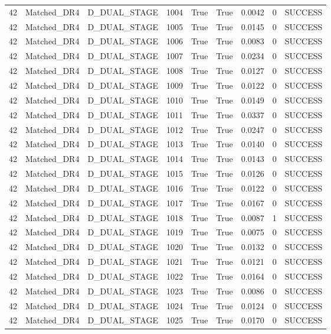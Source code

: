 \documentclass[11pt,a4paper,oneside]{book}
\begin{document}
\begin{longtable}{l l l l l l l l l}
42 & Matched\_DR4 & D\_DUAL\_STAGE & 1004 & True & True & 0.0042 & 0 & SUCCESS \\
42 & Matched\_DR4 & D\_DUAL\_STAGE & 1005 & True & True & 0.0145 & 0 & SUCCESS \\
42 & Matched\_DR4 & D\_DUAL\_STAGE & 1006 & True & True & 0.0083 & 0 & SUCCESS \\
42 & Matched\_DR4 & D\_DUAL\_STAGE & 1007 & True & True & 0.0234 & 0 & SUCCESS \\
42 & Matched\_DR4 & D\_DUAL\_STAGE & 1008 & True & True & 0.0127 & 0 & SUCCESS \\
42 & Matched\_DR4 & D\_DUAL\_STAGE & 1009 & True & True & 0.0122 & 0 & SUCCESS \\
42 & Matched\_DR4 & D\_DUAL\_STAGE & 1010 & True & True & 0.0149 & 0 & SUCCESS \\
42 & Matched\_DR4 & D\_DUAL\_STAGE & 1011 & True & True & 0.0337 & 0 & SUCCESS \\
42 & Matched\_DR4 & D\_DUAL\_STAGE & 1012 & True & True & 0.0247 & 0 & SUCCESS \\
42 & Matched\_DR4 & D\_DUAL\_STAGE & 1013 & True & True & 0.0140 & 0 & SUCCESS \\
42 & Matched\_DR4 & D\_DUAL\_STAGE & 1014 & True & True & 0.0143 & 0 & SUCCESS \\
42 & Matched\_DR4 & D\_DUAL\_STAGE & 1015 & True & True & 0.0126 & 0 & SUCCESS \\
42 & Matched\_DR4 & D\_DUAL\_STAGE & 1016 & True & True & 0.0122 & 0 & SUCCESS \\
42 & Matched\_DR4 & D\_DUAL\_STAGE & 1017 & True & True & 0.0167 & 0 & SUCCESS \\
42 & Matched\_DR4 & D\_DUAL\_STAGE & 1018 & True & True & 0.0087 & 1 & SUCCESS \\
42 & Matched\_DR4 & D\_DUAL\_STAGE & 1019 & True & True & 0.0075 & 0 & SUCCESS \\
42 & Matched\_DR4 & D\_DUAL\_STAGE & 1020 & True & True & 0.0132 & 0 & SUCCESS \\
42 & Matched\_DR4 & D\_DUAL\_STAGE & 1021 & True & True & 0.0121 & 0 & SUCCESS \\
42 & Matched\_DR4 & D\_DUAL\_STAGE & 1022 & True & True & 0.0164 & 0 & SUCCESS \\
42 & Matched\_DR4 & D\_DUAL\_STAGE & 1023 & True & True & 0.0086 & 0 & SUCCESS \\
42 & Matched\_DR4 & D\_DUAL\_STAGE & 1024 & True & True & 0.0124 & 0 & SUCCESS \\
42 & Matched\_DR4 & D\_DUAL\_STAGE & 1025 & True & True & 0.0170 & 0 & SUCCESS \\

\end{longtable}
\end{document}

